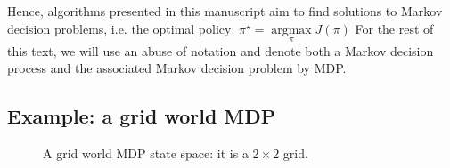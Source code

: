 Hence, algorithms presented in this manuscript aim to find solutions to Markov decision problems, i.e. the optimal policy: $\pi^\star =\underset{\pi}{\operatorname{argmax}}J(\pi)$
For the rest of this text, we will use an abuse of notation and denote both a Markov decision process and the associated Markov decision problem by MDP.
\subsection{Example: a grid world MDP}

\begin{figure}[h]
    \centering
    \caption{A grid world MDP state space: it is a $2\times2$ grid.}
    \end{figure}
    

